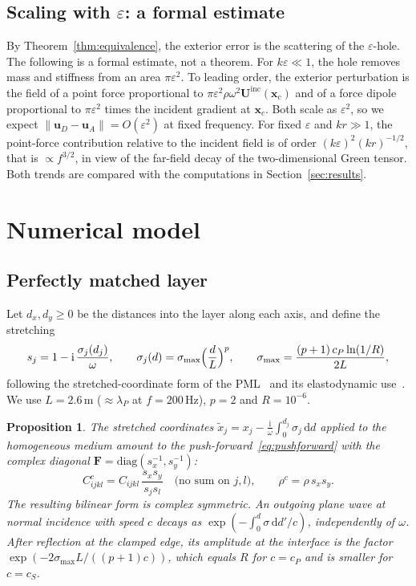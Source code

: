 \documentclass[preprint,12pt]{elsarticle}
\newcommand{\mbf}[1]{\mathbf{#1}}
\newcommand{\be}{\begin{equation}}
\newcommand{\ee}{\end{equation}}
\newtheorem{proposition}{Proposition}
\begin{document}
\subsection{Scaling with $\varepsilon$: a formal estimate}\label{sec:scaling}

By Theorem~\ref{thm:equivalence}, the exterior error is the scattering of the $\varepsilon$-hole. The following is a formal estimate, not a
theorem. For $k\varepsilon\ll1$, the hole removes mass and stiffness from an area $\pi\varepsilon^2$. To
leading order, the exterior perturbation is the field of a point force proportional to
$\pi\varepsilon^2\rho\omega^2\mbf{U}^{\mathrm{inc}}(\mbf{x}_c)$ and of a force dipole proportional to
$\pi\varepsilon^2$ times the incident gradient at $\mbf{x}_c$. Both scale as $\varepsilon^2$, so we expect
$\|\mbf{u}_D-\mbf{u}_A\|=O(\varepsilon^2)$ at fixed frequency. For fixed $\varepsilon$ and $k r\gg1$, the point-force
contribution relative to the incident field is of order $(k\varepsilon)^2(kr)^{-1/2}$, that is $\propto f^{3/2}$, in view of
the far-field decay of the two-dimensional Green tensor. Both trends are compared with the computations in
Section~\ref{sec:results}.

\FloatBarrier
\section{Numerical model}\label{sec:numerics}

\subsection{Perfectly matched layer}\label{sec:pml}

Let $d_x,d_y\ge0$ be the distances into the layer along each axis, and define the stretching
\be\label{eq:stretch}
  s_j=1-\mathrm{i}\,\frac{\sigma_j(d_j)}{\omega},\qquad \sigma_j(d)=\sigma_{\max}\Bigl(\frac{d}{L}\Bigr)^{p},\qquad
  \sigma_{\max}=\frac{(p+1)\,c_P\ln(1/R)}{2L},
\ee
following the stretched-coordinate form of the PML~\citep{berenger1994,chew1994} and its elastodynamic
use~\citep{basu2003}. We use $L=2.6$\,m ($\approx\lambda_P$ at $f=200$\,Hz), $p=2$ and $R=10^{-6}$.

\begin{proposition}\label{prop:pml}
The stretched coordinates $\tilde{x}_j=x_j-\frac{\mathrm{i}}{\omega}\int_0^{d_j}\!\sigma_j\,\mathrm{d}d$ applied to the homogeneous medium
amount to the push-forward~\eqref{eq:pushforward} with the complex diagonal $\mbf{F}=\mathrm{diag}(s_x^{-1},s_y^{-1})$:
\be\label{eq:pml}
  C^{c}_{ijkl}=C_{ijkl}\,\frac{s_xs_y}{s_js_l}\quad\text{(no sum on $j,l$)},\qquad \rho^{c}=\rho\,s_xs_y .
\ee
The resulting bilinear form is complex symmetric. An outgoing plane wave at normal incidence with speed $c$ decays as
$\exp(-\int_0^{d}\sigma\,\mathrm{d}d'/c)$, independently of $\omega$. After reflection at the clamped edge, its amplitude at the
interface is the factor $\exp(-2\sigma_{\max}L/((p+1)c))$, which equals $R$ for $c=c_P$ and is smaller for $c=c_S$.
\end{proposition}
\end{document}
